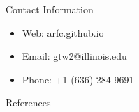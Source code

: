 \documentclass[final]{beamer}
\newlength{\onecolwid}
\newlength{\threecolwid}
\begin{document}
\begin{frame}[t]
\begin{columns}[t,totalwidth=\threecolwid]
\begin{column}{\onecolwid}
\begin{alertblock}{Contact Information}
\begin{itemize}
		\item Web: \href{arfc.github.io}{arfc.github.io}
		\item Email: \href{mailto:gtw2@illinois.edu}{gtw2@illinois.edu}
		\item Phone: +1 (636) 284-9691
	\end{itemize}
	
\end{alertblock}

\begin{block}{References}

        {\footnotesize 
        }
\end{block}





\end{column} %

\end{columns} %

\end{frame} %
\end{document}
